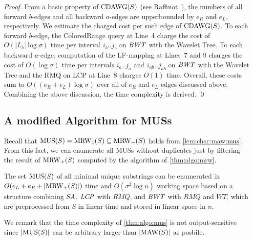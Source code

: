 \begin{proof}
From a basic property of $\mathrm{CDAWG}(S)$ (see Raffinot~\cite{raffinot2001maximal}), the numbers of all forward $b$-edges and all backward $a$-edges are upperbounded by $e_R$ and $e_L$, respectively. We estimate the charged cost per such edge of $\mathrm{CDAWG}(S)$. 
To each forward $b$-edge, the ColoredRange query at Line~4 charge the cost of $O(|L_b| \log\sigma)$ time per interval $i_b..j_b$ on $\mathit{BWT}$ with the Wavelet Tree.
To each backward $a$-edge, computation of the LF-mapping at Lines~7 and 9 charges the cost of $O(\log\sigma)$ time per intervals $i_a..j_a$ and $i_{ab}..j_{ab}$ on $\mathit{BWT}$ with the Wavelet Tree and the RMQ on LCP at Line~8 charges $O(1)$ time.
Overall, these costs sum to $O((e_R + e_L) \log\sigma)$ over all of $e_R$ and $e_L$ edges discussed above. Combining the above discussion, the time complexity is derived. 
\qed 
\end{proof}

\subsection{A modified Algorithm for MUSs}   
Recall that $\mathrm{MUS}(S) = \mathrm{MRW}_1(S) \subseteq \mathrm{MRW}_+(S)$ holds from \cref{lem:char:maw:mus}. From this fact, we can enumerate all MUSs without duplicates just by filtering the result of $\mathrm{MRW}_+(S)$ computed by the algorithm of  \cref{thm:algo:mrw}.  

\begin{proposition}\label{thm:algo:mus}
The set $\mathrm{MUS}(S)$ of all minimal unique substrings can be enumerated in $O(e_L + e_R + |\mathrm{MRW}_+(S)|)$ time and $O(\sigma^2\log n)$ working space
  based on a structure combining $\mathit{SA}$, $\mathit{LCP}$ with $RMQ$, and $\mathit{BWT}$ with $RMQ$ and $WT$,  which are preprocessed from $S$ in linear time and stored in linear space in $n$. 
\end{proposition}

We remark that the time complexity of \cref{thm:algo:mus} is not output-sensitive since $|\mathrm{MUS}(S)|$ can be arbitrary larger than $|\mathrm{MAW}(S)|$ as posbile. 

